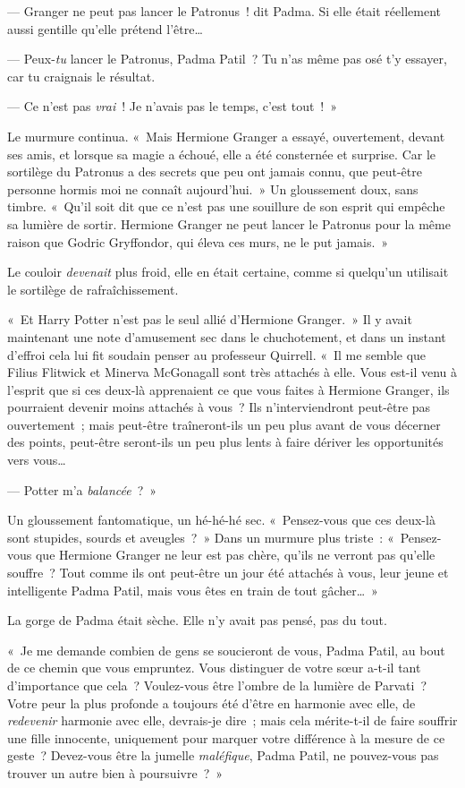--- Granger ne peut pas lancer le Patronus~! dit Padma. Si elle était réellement aussi gentille qu'elle prétend l'être…

--- Peux-\emph{tu} lancer le Patronus, Padma Patil~? Tu n'as même pas osé t'y essayer, car tu craignais le résultat.

--- Ce n'est pas \emph{vrai}~! Je n'avais pas le temps, c'est tout~!~»

Le murmure continua. «~Mais Hermione Granger a essayé, ouvertement, devant ses amis, et lorsque sa magie a échoué, elle a été consternée et surprise. Car le sortilège du Patronus a des secrets que peu ont jamais connu, que peut-être personne hormis moi ne connaît aujourd'hui.~» Un gloussement doux, sans timbre. «~Qu'il soit dit que ce n'est pas une souillure de son esprit qui empêche sa lumière de sortir. Hermione Granger ne peut lancer le Patronus pour la même raison que Godric Gryffondor, qui éleva ces murs, ne le put jamais.~»

Le couloir \emph{devenait} plus froid, elle en était certaine, comme si quelqu'un utilisait le sortilège de rafraîchissement.

«~Et Harry Potter n'est pas le seul allié d'Hermione Granger.~» Il y avait maintenant une note d'amusement sec dans le chuchotement, et dans un instant d'effroi cela lui fit soudain penser au professeur Quirrell. «~Il me semble que Filius Flitwick et Minerva McGonagall sont très attachés à elle. Vous est-il venu à l'esprit que si ces deux-là apprenaient ce que vous faites à Hermione Granger, ils pourraient devenir moins attachés à vous~? Ils n'interviendront peut-être pas ouvertement~; mais peut-être traîneront-ils un peu plus avant de vous décerner des points, peut-être seront-ils un peu plus lents à faire dériver les opportunités vers vous…

--- Potter m'a \emph{balancée}~?~»

Un gloussement fantomatique, un hé-hé-hé sec. «~Pensez-vous que ces deux-là sont stupides, sourds et aveugles~?~» Dans un murmure plus triste~: «~Pensez-vous que Hermione Granger ne leur est pas chère, qu'ils ne verront pas qu'elle souffre~? Tout comme ils ont peut-être un jour été attachés à vous, leur jeune et intelligente Padma Patil, mais vous êtes en train de tout gâcher…~»

La gorge de Padma était sèche. Elle n'y avait pas pensé, pas du tout.

«~Je me demande combien de gens se soucieront de vous, Padma Patil, au bout de ce chemin que vous empruntez. Vous distinguer de votre sœur a-t-il tant d'importance que cela~? Voulez-vous être l'ombre de la lumière de Parvati~? Votre peur la plus profonde a toujours été d'être en harmonie avec elle, de \emph{redevenir} harmonie avec elle, devrais-je dire~; mais cela mérite-t-il de faire souffrir une fille innocente, uniquement pour marquer votre différence à la mesure de ce geste~? Devez-vous être la jumelle \emph{maléfique}, Padma Patil, ne pouvez-vous pas trouver un autre bien à poursuivre~?~»

